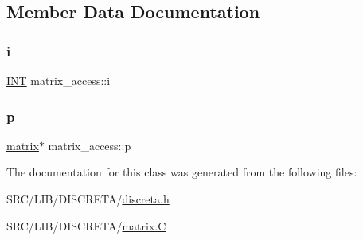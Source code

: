\subsection{Member Data Documentation}
\mbox{\label{classmatrix__access_a3eb84d20310a5ebd7e7fe53816b5d14c}} 
\subsubsection{\texorpdfstring{i}{i}}
{\footnotesize\ttfamily \mbox{\hyperlink{galois_8h_a09fddde158a3a20bd2dcadb609de11dc}{I\+NT}} matrix\+\_\+access\+::i}

\mbox{\label{classmatrix__access_ae387e0cbf6aa984184f7371fec183024}} 
\subsubsection{\texorpdfstring{p}{p}}
{\footnotesize\ttfamily \mbox{\hyperlink{classmatrix}{matrix}}$\ast$ matrix\+\_\+access\+::p}



The documentation for this class was generated from the following files\+:\begin{DoxyCompactItemize}
\item 
S\+R\+C/\+L\+I\+B/\+D\+I\+S\+C\+R\+E\+T\+A/\mbox{\hyperlink{discreta_8h}{discreta.\+h}}\item 
S\+R\+C/\+L\+I\+B/\+D\+I\+S\+C\+R\+E\+T\+A/\mbox{\hyperlink{matrix_8_c}{matrix.\+C}}\end{DoxyCompactItemize}
